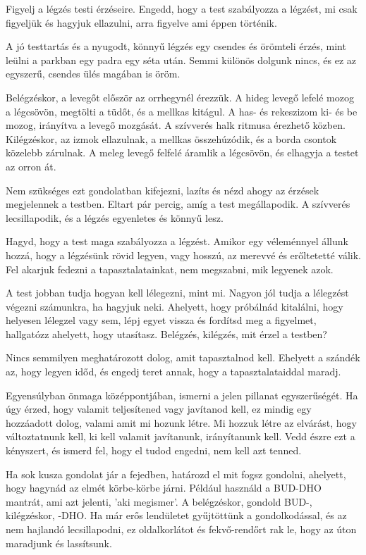 Figyelj a légzés testi érzéseire. Engedd, hogy a test szabályozza a
légzést, mi csak figyeljük és hagyjuk ellazulni, arra figyelve ami éppen
történik.

A jó testtartás és a nyugodt, könnyű légzés egy csendes és örömteli
érzés, mint leülni a parkban egy padra egy séta után. Semmi különös
dolgunk nincs, és ez az egyszerű, csendes ülés magában is öröm.

Belégzéskor, a levegőt először az orrhegynél érezzük. A hideg levegő
lefelé mozog a légcsövön, megtölti a tüdőt, és a mellkas kitágul. A has-
és rekeszizom ki- és be mozog, irányítva a levegő mozgását. A szívverés
halk ritmusa érezhető közben. Kilégzéskor, az izmok ellazulnak, a
mellkas összehúzódik, és a borda csontok közelebb zárulnak. A meleg
levegő felfelé áramlik a légcsövön, és elhagyja a testet az orron át.

Nem szükséges ezt gondolatban kifejezni, lazíts és nézd ahogy az érzések
megjelennek a testben. Eltart pár percig, amíg a test megállapodik. A
szívverés lecsillapodik, és a légzés egyenletes és könnyű lesz.

Hagyd, hogy a test maga szabályozza a légzést. Amikor egy véleménnyel
állunk hozzá, hogy a légzésünk rövid legyen, vagy hosszú, az merevvé és
erőltetetté válik. Fel akarjuk fedezni a tapasztalatainkat, nem
megszabni, mik legyenek azok.

A test jobban tudja hogyan kell lélegezni, mint mi. Nagyon jól tudja a
lélegzést végezni számunkra, ha hagyjuk neki. Ahelyett, hogy próbálnád
kitalálni, hogy helyesen lélegzel vagy sem, lépj egyet vissza és
fordítsd meg a figyelmet, hallgatózz ahelyett, hogy utasítasz. Belégzés,
kilégzés, mit érzel a testben?

Nincs semmilyen meghatározott dolog, amit tapasztalnod kell. Ehelyett a
szándék az, hogy legyen időd, és engedj teret annak, hogy a
tapasztalataiddal maradj.

Egyensúlyban önmaga középpontjában, ismerni a jelen pillanat
egyszerűségét. Ha úgy érzed, hogy valamit teljesítened vagy javítanod
kell, ez mindig egy hozzáadott dolog, valami amit mi hozunk létre. Mi
hozzuk létre az elvárást, hogy változtatnunk kell, ki kell valamit
javítanunk, irányítanunk kell. Vedd észre ezt a kényszert, és ismerd
fel, hogy el tudod engedni, nem kell azt tenned.

Ha sok kusza gondolat jár a fejedben, határozd el mit fogsz gondolni,
ahelyett, hogy hagynád az elmét körbe-körbe járni. Például használd a
BUD-DHO mantrát, ami azt jelenti, 'aki megismer'. A belégzéskor, gondold
BUD-, kilégzéskor, -DHO. Ha már erős lendületet gyűjtöttünk a
gondolkodással, és az nem hajlandó lecsillapodni, ez oldalkorlátot és
fekvő-rendőrt rak le, hogy az úton maradjunk és lassítsunk.

